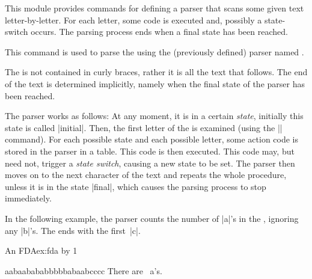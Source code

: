 This module provides commands for defining a parser that scans some
given text letter-by-letter. For each letter, some code is executed
and, possibly a state-switch occurs. The parsing process ends when a
final state has been reached.

\begin{command}{\pgfparserparse{}}
  This command is used to parse the  using the (previously
  defined) parser named .

  The  is not contained in curly braces, rather it is all
  the text that follows. The end of the text is determined implicitly,
  namely when the final state of the parser has been reached.

  The parser works as follows: At any moment, it is in a certain
  \emph{state}, initially this state is called |initial|. Then, the
  first letter of the  is examined (using the |\futurlet|
  command). For each possible state and each possible letter, some
  action code is stored in the parser in a table. This code is then
  executed. This code may, but need not, trigger a \emph{state
    switch}, causing a new state to be set. The parser then moves on
  to the next character of the text and repeats the whole
  procedure, unless it is in the state |final|, which causes the
  parsing process to stop immediately.

  In the following example, the parser counts the number of |a|'s
  in the , ignoring any |b|'s. The  ends with
  the first~|c|.
\begin{texexample}{An FDA}{ex:fda}
\newcount\mycount
{}
{\advance\mycount by 1\relax}
{} %
{}%

aabaabababbbbbabaabcccc
There are \the\mycount\ a's.
\end{texexample}
\end{command}

